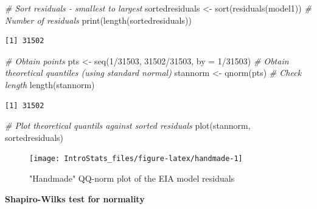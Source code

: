 \documentclass[
  oneside]{krantz}
\newenvironment{Shaded}{\begin{snugshade}}{\end{snugshade}}
\newcommand{\AttributeTok}[1]{\textcolor[rgb]{0.77,0.63,0.00}{#1}}
\newcommand{\CommentTok}[1]{\textcolor[rgb]{0.56,0.35,0.01}{\textit{#1}}}
\newcommand{\DecValTok}[1]{\textcolor[rgb]{0.00,0.00,0.81}{#1}}
\newcommand{\FunctionTok}[1]{\textcolor[rgb]{0.00,0.00,0.00}{#1}}
\newcommand{\NormalTok}[1]{#1}
\newcommand{\OtherTok}[1]{\textcolor[rgb]{0.56,0.35,0.01}{#1}}
\newcommand{\SpecialCharTok}[1]{\textcolor[rgb]{0.00,0.00,0.00}{#1}}
\begin{document}
\begin{Shaded}
\begin{Highlighting}[]
\CommentTok{\# Sort residuals {-} smallest to largest}
\NormalTok{sortedresiduals }\OtherTok{\textless{}{-}} \FunctionTok{sort}\NormalTok{(}\FunctionTok{residuals}\NormalTok{(model1))}
\CommentTok{\# Number of residuals}
\FunctionTok{print}\NormalTok{(}\FunctionTok{length}\NormalTok{(sortedresiduals))}
\end{Highlighting}
\end{Shaded}

\begin{verbatim}
[1] 31502
\end{verbatim}

\begin{Shaded}
\begin{Highlighting}[]
\CommentTok{\# Obtain points }
\NormalTok{pts }\OtherTok{\textless{}{-}} \FunctionTok{seq}\NormalTok{(}\DecValTok{1}\SpecialCharTok{/}\DecValTok{31503}\NormalTok{, }\DecValTok{31502}\SpecialCharTok{/}\DecValTok{31503}\NormalTok{, }\AttributeTok{by =} \DecValTok{1}\SpecialCharTok{/}\DecValTok{31503}\NormalTok{)}
\CommentTok{\# Obtain theoretical quantiles (using standard normal)}
\NormalTok{stannorm }\OtherTok{\textless{}{-}} \FunctionTok{qnorm}\NormalTok{(pts)}
\CommentTok{\# Check length}
\FunctionTok{length}\NormalTok{(stannorm)}
\end{Highlighting}
\end{Shaded}

\begin{verbatim}
[1] 31502
\end{verbatim}

\begin{Shaded}
\begin{Highlighting}[]
\CommentTok{\# Plot theoretical quantils against sorted residuals}
\FunctionTok{plot}\NormalTok{(stannorm, sortedresiduals)}
\end{Highlighting}
\end{Shaded}

\begin{figure}

{\centering \texttt{[image: IntroStats\_files/figure-latex/handmade-1]} 

}

\caption{"Handmade" QQ-norm plot of the EIA model residuals}\label{fig:handmade}
\end{figure}

\textbf{Shapiro-Wilks test for normality}
\end{document}
